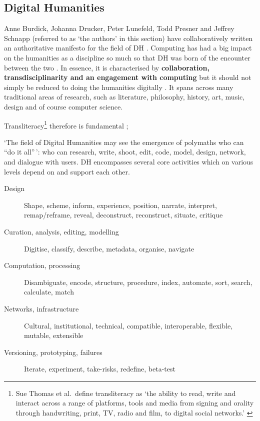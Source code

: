 

\subsection*{Digital Humanities}

Anne Burdick, Johanna Drucker, Peter Lunefeld, Todd Presner and Jeff\-rey Schn\-app (referred to as `the authors' in this section) have collaboratively written an authoritative manifesto for the field of \ac{DH} \autocite{Burdick2012}. Computing has had a big impact on the humanities as a discipline so much so that \ac{DH} was born of the encounter between the two \autocite[p.3]{Burdick2012}. In essence, it is characterised by \textbf{collaboration, transdisciplinarity and an engagement with computing} \autocite[p.122]{Burdick2012} but it should not simply be reduced to doing the humanities digitally \autocite[p.101]{Burdick2012}. It spans across many traditional areas of research, such as literature, philosophy, history, art, music, design and of course computer science.

\begin{draft}
  Transliteracy\footnote{Sue Thomas et al.\ define transliteracy as `the ability to read, write and interact across a range of platforms, tools and media from signing and orality through handwriting, print, TV, radio and film, to digital social networks.' \autocite{Thomas2007}} therefore is fundamental \autocite{Thomas2007};
\end{draft}

`The field of Digital Humanities may see the emergence of polymaths who can ``do it all''\,': who can research, write, shoot, edit, code, model, design, network, and dialogue with users. \autocite[p.15]{Burdick2012} \ac{DH} encompasses several core activities which on various levels depend on and support each other.

\begin{description}
  \item [Design] Shape, scheme, inform, experience, position, narrate,
  					interpret, remap/reframe, reveal, deconstruct, reconstruct,
  					situate, critique
  \item [Curation, analysis, editing, modelling] Digitise, classify, describe, metadata, organise, navigate
  \item [Computation, processing] Disambiguate, encode, structure, procedure, index, automate, sort, search, calculate, match
  \item [Networks, infrastructure] Cultural, institutional, technical, compatible, interoperable, flexible, mutable, extensible
  \item [Versioning, prototyping, failures]	Iterate, experiment, take-risks, redefine, beta-test
\end{description}

